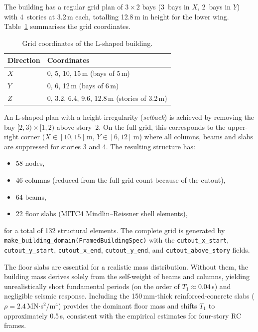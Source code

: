 The building has a regular grid plan of $3 \times 2$ bays
(3~bays in $X$, 2~bays in $Y$) with 4~stories at 3.2\,m each,
totalling 12.8\,m in height for the lower wing.
Table~\ref{tab:lshaped-grid} summarises the grid coordinates.

\begin{table}[htbp]
  \centering
  \caption{Grid coordinates of the L-shaped building.}
  \label{tab:lshaped-grid}
  \begin{tabular}{ll}
    \toprule
    Direction & Coordinates \\
    \midrule
    $X$ & 0, 5, 10, 15\,m  \quad (bays of 5\,m) \\
    $Y$ & 0, 6, 12\,m  \quad (bays of 6\,m) \\
    $Z$ & 0, 3.2, 6.4, 9.6, 12.8\,m  \quad (stories of 3.2\,m) \\
    \bottomrule
  \end{tabular}
\end{table}

An L-shaped plan with a height irregularity (\emph{setback}) is
achieved by removing the bay $[2,3) \times [1,2)$ above story~2.
On the full grid, this corresponds to the upper-right corner
($X \in [10, 15]$\,m, $Y \in [6, 12]$\,m) where all columns, beams
and slabs are suppressed for stories 3 and 4.
The resulting structure has:

\begin{itemize}
  \item 58 nodes,
  \item 46 columns (reduced from the full-grid count because of the cutout),
  \item 64 beams,
  \item 22 floor slabs (MITC4 Mindlin--Reissner shell elements),
\end{itemize}
for a total of 132 structural elements.
The complete grid is generated by
\texttt{make\_building\_domain(FramedBuildingSpec)} with
the \texttt{cutout\_x\_start}, \texttt{cutout\_y\_start},
\texttt{cutout\_x\_end}, \texttt{cutout\_y\_end}, and
\texttt{cutout\_above\_story} fields.

The floor slabs are essential for a realistic mass distribution.
Without them, the building mass derives solely from the self-weight of
beams and columns, yielding unrealistically short fundamental periods
(on the order of $T_1 \approx 0.04$\,s) and negligible seismic response.
Including the 150\,mm-thick reinforced-concrete slabs
($\rho = 2.4$\,MN$\cdot$s$^2$/m$^4$) provides the dominant floor mass
and shifts $T_1$ to approximately 0.5\,s, consistent with the
empirical estimates for four-story RC frames.


